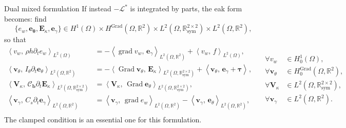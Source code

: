 \documentclass[aspectratio=169]{ISAE-Beamer}
\DeclareMathOperator*{\grad}{grad}
\DeclareMathOperator*{\Grad}{Grad}
\newcommand{\bbR}{\mathbb{R}}
\newcommand{\inner}[3][]{\ensuremath{\left\langle #2, \, #3 \right\rangle_{#1}}}
\begin{document}
\begin{frame}{Dual mixed formulation}
If instead $-\mathcal{L}^*$ is integrated by parts, the eak form becomes: find
$$\{e_w, \bm{e}_{\bm{\theta}}, \bm{E}_{\kappa}, \bm{e}_{\gamma}\} \in H^{1}(\Omega) \times H^{\Grad}(\Omega, \bbR^2) \times L^2(\Omega, \bbR^{2\times 2}_{\text{sym}}) \times L^2(\Omega, \bbR^2), $$
so that 
\begin{equation*}
\begin{aligned}
\inner[L^2(\Omega)]{v_w}{\rho h \partial_t e_w} &= -\inner[L^2(\Omega, \mathbb{R}^{2})]{\grad v_w}{\bm{e}_\gamma} + \inner[L^2(\Omega)]{v_w}{f}, \\
\inner[L^2(\Omega, \mathbb{R}^{2})]{\bm{v}_\theta}{I_\theta \partial_t \bm{e}_\theta} &= -\inner[L^2(\Omega, \mathbb{R}^{2\times 2}_{\text{sym}})]{\Grad \bm{v}_\theta}{\bm{E}_\kappa} + \inner{\bm{v}_\theta}{\bm{e}_\gamma + \bm{\tau}}, \\
\inner[L^2(\Omega, \mathbb{R}^{2\times 2}_{\text{sym}})]{\bm{V}_\kappa}{\bm{\mathcal{C}_b} \partial_t \bm{E}_\kappa} &= \inner[L^2(\Omega, \mathbb{R}^{2\times 2}_{\text{sym}})]{\bm{V}_\kappa}{\Grad \bm{e}_\theta}, \\
\inner[L^2(\Omega, \mathbb{R}^{2})]{\bm{v}_\gamma}{C_s \partial_t \bm{e}_\gamma} &= \inner[L^2(\Omega, \mathbb{R}^{2})]{\bm{v}_\gamma}{\grad e_w} - \inner[L^2(\Omega, \mathbb{R}^{2})]{\bm{v}_\gamma}{\bm{e}_\theta}, \\
\end{aligned} \quad
\begin{aligned}
\forall v_w &\in H^{1}_0(\Omega), \\
\forall \bm{v}_\theta &\in H^{\Grad}_0(\Omega, \bbR^2), \\
\forall \bm{V}_\kappa &\in L^2(\Omega, \bbR^{2\times 2}_{\text{sym}}), \\
\forall \bm{v}_\gamma &\in L^2(\Omega, \bbR^2).
\end{aligned}
\end{equation*}
The clamped condition is an essential one for this formulation.
\end{frame}
\end{document}
